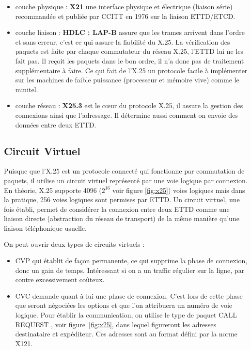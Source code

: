 \documentclass[12pt]{report}
\begin{document}
\begin{itemize}
\item couche physique : \textbf{X21} une interface physique et électrique (liaison série) recommandée et publiée par CCITT en 1976 sur la liaison ETTD/ETCD\cite{wikix21}.
\item couche liaison : \textbf{HDLC : LAP-B} assure que les trames arrivent dans l'ordre et sans erreur, c'est ce qui assure la fiabilité du X.25. La vérification des paquets est faite
par chaque commutateur du réseau X.25, l'ETTD lui ne les fait pas. Il reçoit les paquets dans le bon ordre, il n'a donc pas de traitement supplémentaire à faire. Ce qui fait de l'X.25 un protocole facile
à implémenter sur les machines de faible puissance (processeur et mémoire vive) comme le minitel\cite{wikilapb}.
\item couche réseau : \textbf{X25.3} est le cœur du protocole X.25, il assure la gestion des connexions ainsi que l'adressage\cite{gatoux}. Il détermine aussi comment on envoie des données entre deux ETTD.
\end{itemize}

\subsection{Circuit Virtuel}
Puisque que l'X.25 est un protocole connecté qui fonctionne par commutation de paquets, il utilise un circuit virtuel représenté par une voie logique par connexion. En théorie, X.25 supporte 4096 ($2^{16}$ voir figure \ref{fig:x25}) voies logiques mais dans la pratique, 256 voies logiques sont permises par ETTD.
Un circuit virtuel, une fois établi, permet de considérer la connexion entre deux ETTD comme une liaison directe (abstraction du réseau de transport) de la même manière qu'une liaison téléphonique usuelle\cite{navarro}.

On peut ouvrir deux types de circuits virtuels :
\begin{itemize}
\item \gls{CVP} qui établit de façon permanente, ce qui supprime la phase de connexion, donc un gain de temps. Intéressant si on a un traffic régulier sur la ligne, par contre excessivement coûteux.
\item \gls{CVC} demande quant à lui une phase de connexion. C'est lors de cette phase que seront négociées les options et que l'on attribuera un numéro de voie logique. Pour établir la communication, on utilise le type de paquet \og CALL REQUEST \fg, voir figure~\ref{fig:x25}, dans lequel figureront les adresses destinataire et expéditeur. Ces adresses sont au format défini par la norme X121\cite{navarro}\cite{gateau}.
\end{itemize}
\end{document}
